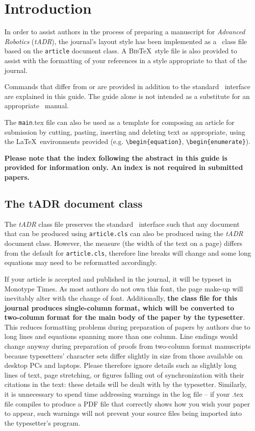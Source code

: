 \documentclass{tADR2e}
\begin{document}
\section{Introduction}

In order to assist authors in the process of preparing a manuscript for {\itshape Advanced Robotics} ({\it tADR}), the journal's layout style has been implemented as a \LaTeXe\ class file based on the {\tt article} document class. A \textsc{Bib}\TeX\ style file is also provided to assist with the formatting of your references in a style appropriate to that of the journal.

Commands that differ from or are provided in addition to the standard \LaTeXe\ interface are explained in this guide. The guide alone is not intended as a substitute for an appropriate \LaTeXe\ manual.

The {\tt main}.tex file can also be used as a template for composing an article for submission by cutting, pasting, inserting and
deleting text as appropriate, using the \LaTeX\ environments provided (e.g. \verb"\begin{equation}", \verb"\begin{enumerate}").

{\bf{Please note that the index following the abstract in this guide is provided for information only. An index is not required in submitted papers.}}

\subsection{The {\bi tADR} document class}

The {\it tADR} class file preserves the standard \LaTeXe\ interface such that any document that can
be produced using {\tt article.cls} can also be produced using the {\it tADR} document class.
However, the measure (the width of the text on a page) differs from the default for {\tt article.cls}, therefore line breaks
will change and some long equations may need to be reformatted accordingly.

If your article is accepted and published in the journal, it will be typeset in Monotype Times. As most authors do not own this font, the page make-up will inevitably alter with the change of font. Additionally, \textbf{the class file for this journal produces single-column format, which will be converted to two-column format for the main body of the paper by the typesetter}. This reduces formatting problems during preparation of papers by authors due to long lines and equations spanning more than one column. Line endings would change anyway during preparation of proofs from two-column format manuscripts because typesetters' character sets differ slightly in size from those available on desktop PCs and laptops. Please therefore ignore details such as slightly long lines of text, page stretching, or figures falling out of synchronization with their citations in the text: these details will be dealt with by the typesetter. Similarly, it is unnecessary to spend time addressing warnings in the log file -- if your .tex file compiles to produce a PDF file that correctly shows how you wish your paper to appear, such warnings will not prevent your source files being imported into the typesetter's program.
\end{document}
